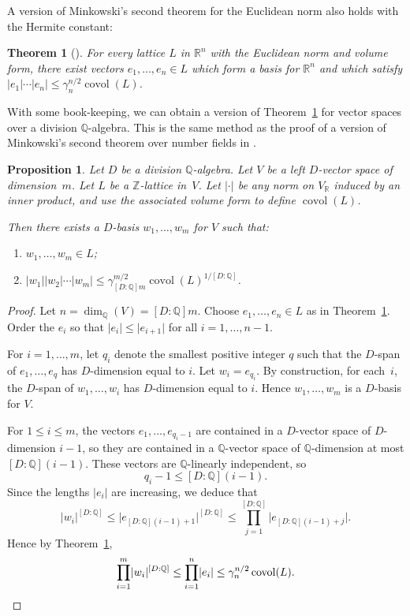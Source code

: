 \documentclass[JEP,XML,SOM,Unicode,NoFloatCountersInSection]{cedram}
\newenvironment{enumeratei}
{\bgroup\def\theenumi{\roman{enumi}}\def\theenumii{\alph{enumii}}\begin{enumerate}}
{\end{enumerate}\egroup}
\newcommand{\bQ}{\mathbb{Q}}
\newcommand{\bR}{\mathbb{R}}
\newcommand{\bZ}{\mathbb{Z}}
\DeclareMathOperator{\covol}{covol}
\newcommand{\abs}[1]{\lvert #1 \rvert}
\newtheorem{proposition}[lemma]{Proposition}
\newtheorem{theorem}[lemma]{Theorem}
\begin{document}
A version of Minkowski's second theorem for the Euclidean norm also holds with the Hermite constant:

\begin{theorem}[{\cite[Chap.\,VIII, Th.\,1]{cassels:geom-of-numbers}}] \label{minkowski-2nd}
For every lattice $L$ in $\bR^n$ with the Euclidean norm and volume form, there exist vectors $e_1, \dotsc, e_n \in L$ which form a basis for $\bR^n$ and which satisfy $\abs{e_1}\dotsm\abs{e_n} \leq \gamma_n^{n/2} \covol(L)$.
\end{theorem}

With some book-keeping, we can obtain a version of Theorem~\ref{minkowski-2nd} for vector spaces over a division $\bQ$-algebra. This is the same method as the proof of a version of Minkowski's second theorem over number fields in \cite[C.2.18]{BG06}.

\begin{proposition} \label{D-minkowski}
Let $D$ be a division $\bQ$-algebra.
Let $V$ be a left $D$-vector space of dimension~$m$.
Let $L$ be a $\bZ$-lattice in~$V$.
Let $\abs{\cdot}$ be any norm on $V_\bR$ induced by an inner product, and use the associated volume form to define $\covol(L)$.

Then there exists a $D$-basis $w_1, \dotsc, w_m$ for $V$ such that:
\begin{enumeratei}
\item $w_1, \dotsc, w_m \in L$;
\item $\abs{w_1} \abs{w_2} \dotsm \abs{w_m} \leq \gamma_{[D:\bQ]m}^{m/2} \covol(L)^{1/[D:\bQ]}$.
\end{enumeratei}
\end{proposition}

\begin{proof}
Let $n = \dim_\bQ(V) = [D:\bQ]m$.
Choose $e_1, \dotsc, e_n \in L$ as in Theorem~\ref{minkowski-2nd}.
Order the $e_i$ so that $\abs{e_i} \leq \abs{e_{i+1}}$ for all $i = 1, \dotsc, n-1$.

For $i = 1, \dotsc, m$, let $q_i$ denote the smallest positive integer $q$ such that the $D$-span of $e_1, \dotsc, e_q$ has $D$-dimension equal to $i$.
Let $w_i = e_{q_i}$.
By construction, for each~$i$, the $D$-span of $w_1, \dotsc, w_i$ has $D$-dimension equal to $i$. Hence $w_1, \dotsc, w_m$ is a $D$-basis for $V$.

For $1 \leq i \leq m$, the vectors $e_1, \dotsc, e_{q_i-1}$ are contained in a $D$-vector space of $D$\nobreakdash-dimension $i-1$, so they are contained in a $\bQ$-vector space of $\bQ$-dimension at most $[D:\bQ](i-1)$. These vectors are $\bQ$-linearly independent, so
\[
q_i - 1 \leq [D:\bQ](i-1).
\]
Since the lengths $\abs{e_i}$ are increasing, we deduce that
\[
\abs{w_i}^{[D:\bQ]} \leq \abs{e_{[D:\bQ](i-1) + 1}}^{[D:\bQ]} \leq \prod_{j=1}^{[D:\bQ]} \abs{e_{[D:\bQ](i-1) + j}}.
\]
Hence by Theorem~\ref{minkowski-2nd},
\[
\prod_{i=1}^m \abs{w_i}^{[D:\bQ]} \leq \prod_{i=1}^n \abs{e_i} \leq \gamma_n^{n/2} \covol(L).
\qedhere
\]
\end{proof}
\end{document}
